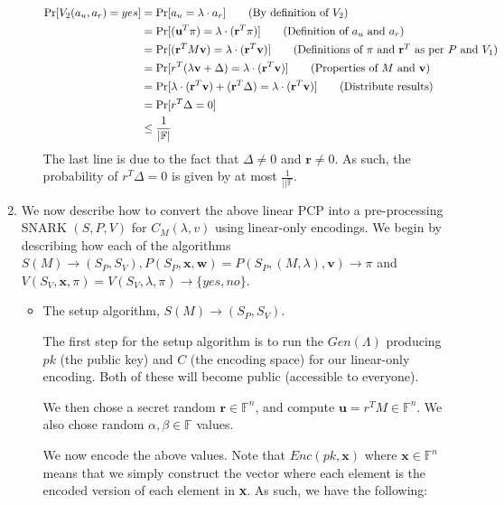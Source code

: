 \documentclass[12pt]{exam}
\begin{document}
\begin{questions}
\begin{solution}
\begin{enumerate}[label=\textbf{\alph*.}]
\begin{itemize}
      \begin{align*}
        \Pr[V_2(a_u, a_r) = yes] &= \Pr[a_u = \lambda \cdot a_r] \tag{By definition of $V_2$} \\
        &= \Pr[(\textbf{u}^T \pi) = \lambda \cdot (\textbf{r}^T \pi)] \tag{Definition of $a_u$ and $a_r$} \\
        &= \Pr[(\textbf{r}^TM\textbf{v})  = \lambda \cdot (\textbf{r}^T \textbf{v})] \tag{Definitions of $\pi$ and $\textbf{r}^T$ as per $P$ and $V_1$} \\
        &= \Pr[r^T(\lambda \textbf{v} + \Delta) = \lambda \cdot (\textbf{r}^T \textbf{v})] \tag{Properties of $M$ and $\textbf{v}$} \\
        &= \Pr[\lambda \cdot (\textbf{r}^T\textbf{v}) + (\textbf{r}^T\Delta) = \lambda \cdot (\textbf{r}^T \textbf{v})] \tag{Distribute results} \\
        &= \Pr[r^T\Delta = 0] \\
        &\leq \frac{1}{|\mathbb{F}|} 
      \end{align*}
      The last line is due to the fact that $\Delta \neq 0$ and $\textbf{r} \neq 0$. As such, the probability of $r^T\Delta = 0$ is given by at most $\frac{1}{||\mathbb{F}}$.
    \end{itemize}
    \item We now describe how to convert the above linear PCP into a pre-processing SNARK $(S, P, V)$ for $C_M(\lambda, v)$ using linear-only encodings. We begin by describing how each of the algorithms $S(M) \rightarrow (S_P, S_V), P(S_P, \textbf{x}, \textbf{w}) = P(S_P, (M, \lambda), \textbf{v}) \rightarrow \pi$ and $V(S_V, \textbf{x}, \pi) = V(S_V, \lambda, \pi) \rightarrow \{\textit{yes}, \textit{no}\}$.
    \begin{itemize}
      \item The setup algorithm, $S(M) \rightarrow (S_P, S_V)$.

        The first step for the setup algorithm is to run the $\textit{Gen}(\Lambda)$ producing $pk$ (the public key) and $C$ (the encoding space) for our linear-only encoding. Both of these will become public (accessible to everyone).
        
        We then chose a secret random $\textbf{r} \in \mathbb{F}^n$, and compute $\textbf{u} = r^TM \in \mathbb{F}^n$. We also chose random $\alpha, \beta \in \mathbb{F}$ values. 

        We now encode the above values. Note that $\textit{Enc}(pk, \textbf{x})$ where $\textbf{x} \in \mathbb{F}^n$ means that we simply construct the vector where each element is the encoded version of each element in \textbf{x}. As such, we have the following:


\end{itemize}
\end{enumerate}
\end{solution}
\end{questions}
\end{document}
